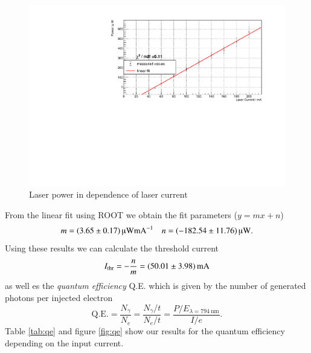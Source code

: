 \documentclass[11pt,a4paper,notitlepage]{scrartcl}
\begin{document}
\begin{figure}[htbp]
	\centering
	\includegraphics[width=\linewidth]{figs/measurements/laser_current.pdf}
	\caption{Laser power in dependence of laser current}
	\label{fig:linear}
\end{figure}
From the linear fit using ROOT we obtain the fit parameters ($y=mx+n$) \begin{align*}
	m=\SI{3.65\pm0.17}{\micro\W\milli\A^{-1}} && n =   \SI{-182.54\pm11.76}{\micro\W}. 
\end{align*}
Using these results we can calculate the threshold current $$I_{\text{thr}}=-\frac{n}{m}=\SI{50.01\pm3.98}{\milli\A}$$
as well es the \emph{quantum efficiency} Q.E. which is given by the number of generated photons per injected electron  $$\text{Q.E.}=\frac{N_\gamma}{N_e}=\frac{N_\gamma/t}{N_e/t}=\frac{P/E_{\lambda=\SI{794}{\nano\m}}}{I/e}.$$
Table \ref{tab:qe} and figure \ref{fig:qe} show our results for the quantum efficiency depending on the input current. 
\end{document}
